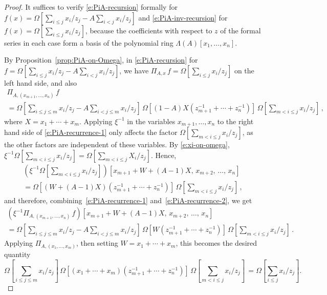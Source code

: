 \documentclass[12pt]{amsart}
\theoremstyle{definition}
\theoremstyle{remark}
\begin{document}
\begin{proof}
It suffices to verify \eqref{e:PiA-recursion} formally for $f(x) =
\Omega [\sum _{i\leq j} x_{i}/z_{j} - A \sum _{i<j}x_{i}/z_{j}]$ and
\eqref{e:PiA-inv-recursion} for $f(x) = \Omega [\sum _{i\leq j}
x_{i}/z_{j}]$, because the coefficients with respect to $z$ of the
formal series in each case form a basis of the polynomial ring
$\Lambda (A)[x_{1},\ldots,x_{n}]$.

By Proposition~\ref{prop:PiA-on-Omega}, in \eqref{e:PiA-recursion} for
$f = \Omega [\sum _{i\leq j} x_{i}/z_{j} - A \sum _{i<j}x_{i}/z_{j}]$,
we have $\Pi _{A,x}\, f = \Omega [\sum _{i\leq j} x_{i}/z_{j}]$ on the
left hand side, and also
\begin{multline}\label{e:PiA-recurrence-1}
\Pi _{A, (x_{m+1},\ldots, x_{n})}\, f\\
 =  \Omega [\sum _{i\leq
j\leq m} x_{i}/z_{j} - A \sum _{i< j\leq m} x_{i}/z_{j}]\, \Omega
[(1-A) X (z_{m+1}^{-1}+\cdots +z_{n}^{-1})]\,\Omega [\sum _{m<i\leq j} x_{i}/z_{j}] \,,
\end{multline}
where $X = x_{1}+\cdots +x_{m}$.  Applying $\xi ^{-1}$ in the
variables $x_{m+1},\ldots,x_{n}$ to the right hand side of
\eqref{e:PiA-recurrence-1} only affects the factor $\Omega [\sum
_{m<i\leq j} x_{i}/z_{j}]$, as the other factors are independent of
these variables.  By \eqref{e:xi-on-omega}, $\xi ^{-1} \Omega [\sum _{m<i\leq j} x_{i}/z_{j}] = \Omega [\sum _{m<i\leq j} X_{i}/z_{j}]$.  Hence,
\begin{multline}\label{e:PiA-recurrence-2}
(\xi ^{-1} \Omega [\sum _{m<i\leq j} x_{i}/z_{j}])[x_{m+1}+W+(A-1)X,\,
x_{m+2},\, \ldots,\, x_{n}] \\
 =  \Omega [(W+(A-1)X)
(z_{m+1}^{-1}+\cdots +z_{n}^{-1})]\,\Omega [\sum _{m<i\leq j} x_{i}/z_{j}]\,,
\end{multline}
and therefore, combining~\eqref{e:PiA-recurrence-1}
and~\eqref{e:PiA-recurrence-2}, we get
\begin{multline}\label{e:PiA-recurrence-3}
(\xi ^{-1} \Pi _{A,(x_{m+1},\ldots,x_{n})}\, f)[x_{m+1}+W+(A-1)X,\,
x_{m+2},\,
\ldots,\, x_{n}]\\
 =  \Omega [\sum _{i\leq
j\leq m} x_{i}/z_{j} - A \sum _{i< j\leq m} x_{i}/z_{j}]\, \Omega [W
(z_{m+1}^{-1}+\cdots +z_{n}^{-1})]\,\Omega [\sum _{m<i\leq j} x_{i}/z_{j}] \,.
\end{multline}
Applying $\Pi _{A,(x_{1},\ldots,x_{m})}$, then setting $W =
x_{1}+\cdots +x_{m}$, this becomes the desired quantity
\begin{equation}\label{e:PiA-recurrence-4}
 \Omega [\sum _{i\leq j\leq
m} x_{i}/z_{j} ]\, \Omega [(x_{1}+\cdots +x_{m}) (z_{m+1}^{-1}+\cdots
+z_{n}^{-1})]\,\Omega [\sum _{m<i\leq j} x_{i}/z_{j}] \, = \Omega [\sum _{i\leq j} x_{i}/z_{j}].
\end{equation}


\end{proof}
\end{document}
